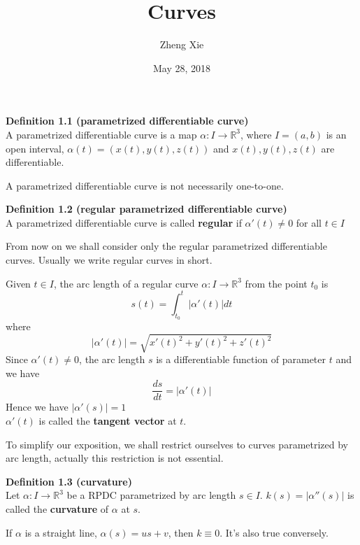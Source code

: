 \documentclass{article}
\author{Zheng Xie}
\title{Curves}
\date{May 28, 2018}
\begin{document}
\maketitle

\setlength\parindent{0em}   %
\setlength\parskip{1.0\baselineskip} %

\par
\textbf{Definition 1.1 (parametrized differentiable curve)}\\
A parametrized differentiable curve is a map $\alpha :I \to \mathbb R^3$, 
where $I = (a,b)$ is an open interval, $\alpha(t) = (x(t),y(t),z(t))$ and $x(t),y(t),z(t)$ are differentiable.

\par
A parametrized differentiable curve is not necessarily one-to-one.

\par
\textbf{Definition 1.2 (regular parametrized differentiable curve)}\\
A parametrized differentiable curve is called \textbf{regular} if $\alpha'(t) \neq 0$ for all $t \in I$

\par
From now on we shall consider only the regular parametrized differentiable curves.
Usually we write regular curves in short.

\par
Given $t \in I$, the arc length of a regular curve $\alpha:I \to \mathbb R^3$ from the point $t_0$ is
$$
    s(t) = \int_{t_0}^t |{\alpha'(t)}|dt
$$
where
$$
    |{\alpha'(t)}| = \sqrt{x'(t)^2+y'(t)^2+z'(t)^2}
$$
Since $\alpha'(t) \neq 0$, the arc length $s$ is a differentiable function of parameter $t$ and we have
$$
    \frac{ds}{dt}=|\alpha'(t)|
$$
Hence we have $|\alpha'(s)| = 1$\\
$\alpha'(t)$ is called the \textbf{tangent vector} at $t$.

\par
To simplify our exposition, we shall restrict ourselves to curves parametrized by arc length, 
actually this restriction is not essential.

\par
\textbf{Definition 1.3 (curvature)}\\
Let $\alpha: I \to \mathbb R^3$ be a RPDC parametrized by arc length $s \in I$. $k(s) = |\alpha''(s)|$ is
called the \textbf{curvature} of $\alpha$ at $s$.

\par
If $\alpha$ is a straight line, $\alpha(s) = us + v$, then $k \equiv 0$. It's also true conversely.
\end{document}
